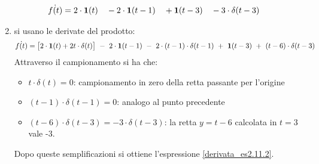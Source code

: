 \documentclass[../main.tex]{subfiles}
\begin{document}
\begin{Exercise}[title={Derivata di una funzione definita a tratti}, difficulty=3]
\begin{enumerate}
\begin{align}
					\dot{f(t)} &= 2 \cdot \textbf{1}(t) &&- 2 \cdot \gr[t-1] &&+ \gr[t-3] && - 3 \cdot \delta(t-3)
					\label{derivata_es2.11.2}
				\end{align}
			\item si usano le derivate del prodotto:
			$$ \dot{f(t)} = \big[ 2 \cdot \gr[t] + 2t \cdot \delta(t) \big]\ -\ 2 \cdot \gr[t-1]\ -\ 2 \cdot (t-1) \cdot \delta(t-1)\ +\ \gr[t-3]\ +\ (t-6) \cdot \delta(t-3) $$
			Attraverso il campionamento si ha che:
			\begin{itemize}
				\item $ t \cdot \delta(t) = 0 $: campionamento in zero della retta passante per l'origine
				\item $ (t-1) \cdot \delta(t-1) = 0$: analogo al punto precedente
				\item $ (t-6) \cdot \delta(t-3) = - 3 \cdot \delta(t-3) $: la retta $ y=t-6 $ calcolata in $ t=3 $ vale -3. 
			\end{itemize}
			Dopo queste semplificazioni si ottiene l'espressione \ref{derivata_es2.11.2}.
		\end{enumerate}
	\end{Exercise}
\end{document}
